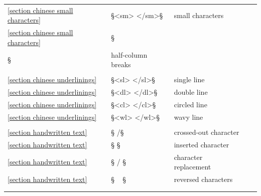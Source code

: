 \documentclass[fontsize=11pt, paper=a4, 
DIV15,
headings=normal,
parskip=half-, 
numbers=noenddot]{scrartcl}
\begin{document}
\begin{longtable}[l]{@{}llll@{}l@{}}
\\
\ref{section chinese small characters} & §<sm> </sm>§ & small characters & \\
\ref{section chinese small characters} & §\\§ & half-column breaks && \\
\\
\ref{section chinese underlinings} & §<sl> </sl>§ & single line & \\
\ref{section chinese underlinings} & §<dl> </dl>§ & double line & \\
\ref{section chinese underlinings} & §<cl> </cl>§ & circled line & \\
\ref{section chinese underlinings} & §<wl> </wl>§ & wavy line & \\
\\
\ref{section handwritten text} & §{ /}§ & crossed-out character & \\
\ref{section handwritten text} & §{ }§ & inserted character & \\
\ref{section handwritten text} & §{ / }§ & character replacement & \\
\ref{section handwritten text} & §{ ~ }§ & reversed characters & \\
\\
\hline \\
\end{longtable}
\end{document}
